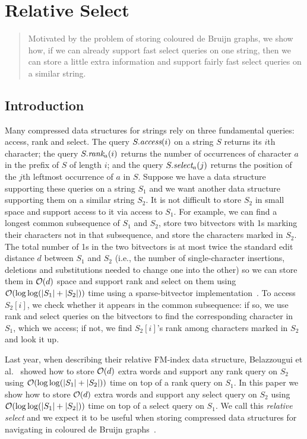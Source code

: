 \chapter{Relative Select}

\begin{quote}
Motivated by the problem of storing coloured de Bruijn graphs, we show how, if we can already support fast select queries on one string, then we can store a little extra information and support fairly fast select queries on a similar string.
\end{quote}

\section{Introduction}
\label{rs-sec:introduction}

Many compressed data structures for strings rely on three fundamental queries: access, rank and select.  The query \(S.\textit{access} (i)\) on a string $S$ returns its $i$th character; the query \(S.\textit{rank}_a (i)\) returns the number of occurrences of character $a$ in the prefix of $S$ of length $i$; and the query \(S.\textit{select}_a (j)\) returns the position of the $j$th leftmost occurrence of $a$ in $S$.  Suppose we have a data structure supporting these queries on a string $S_1$ and we want another data structure supporting them on a similar string $S_2$.  It is not difficult to store $S_2$ in small space and support access to it via access to $S_1$.  For example, we can find a longest common subsequence of $S_1$ and $S_2$, store two bitvectors with 1s marking their characters not in that subsequence, and store the characters marked in $S_2$.  The total number of 1s in the two bitvectors is at most twice the standard edit distance $d$ between $S_1$ and $S_2$ (i.e., the number of single-character insertions, deletions and substitutions needed to change one into the other) so we can store them in $\mathcal{O}\!\left( d \right)$ space and support rank and select on them using $\mathcal{O}\!\left( \log \log (|S_1| + |S_2|) \right)$ time using a sparse-bitvector implementation~\cite{GBMP14}.  To access \(S_2 [i]\), we check whether it appears in the common subsequence: if so, we use rank and select queries on the bitvectors to find the corresponding character in $S_1$, which we access; if not, we find \(S_2 [i]\)'s rank among characters marked in $S_2$ and look it up.

Last year, when describing their relative FM-index data structure, Belazzougui et al.~\cite{BGGMS14} showed how to store $\mathcal{O}\!\left( d \right)$ extra words and support any rank query on $S_2$ using $\mathcal{O}\!\left( \log \log (|S_1| + |S_2|) \right)$ time on top of a rank query on $S_1$.  In this paper we show how to store $\mathcal{O}\!\left( d \right)$ extra words and support any select query on $S_2$ using $\mathcal{O}\!\left( \log \log (|S_1| + |S_2|) \right)$ time on top of a select query on $S_1$.  We call this {\em relative select} and we expect it to be useful when storing compressed data structures for navigating in coloured de Bruijn graphs~\cite{ICTFM12}.

